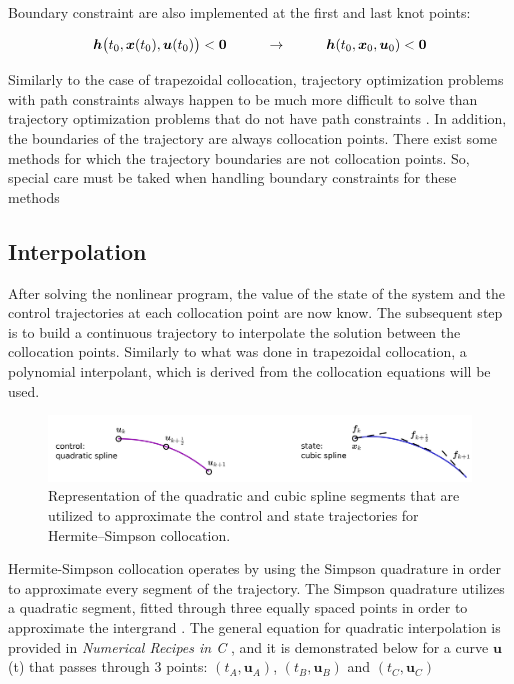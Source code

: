 \documentclass{thesisreport}
\begin{document}
\noindent Boundary constraint are also implemented at the first and last knot points:

\begin{equation}
\bm{h}\big(t_0,\bm{x}(t_0),\bm{u}(t_0)\big) < \bm{0} \text{\hspace{1cm}} \rightarrow \text{\hspace{1cm}} \bm{h}(t_0,\bm{x}_0,\bm{u}_0) <\bm{0}
\end{equation}

\noindent Similarly to the case of trapezoidal collocation, trajectory optimization problems with path constraints always happen to be much more difficult to solve than trajectory optimization problems that do not have path constraints \cite{Betts2010}. In addition, the boundaries of the trajectory are always collocation points. There exist some methods for which the trajectory boundaries are not collocation points. So, special care must be taked when handling boundary constraints for these methods \cite{Benson2006, Garg2010}
  
\subsection{Interpolation}
 
 After solving the nonlinear program, the value of the state of the system and the control trajectories at each collocation point are now know. The subsequent step is to build a continuous trajectory to interpolate the solution between the collocation points. Similarly to what was done in trapezoidal collocation, a polynomial interpolant, which is derived from the collocation equations will be used.
  
 \begin{figure}[h]
 \centering 
 \includegraphics[width=\textwidth]{Images/Trajectory/Hermite-Simpson_Rule}
 \caption{Representation of the quadratic and cubic spline segments that are utilized to approximate the control and state trajectories for Hermite–Simpson collocation.}
 \label{Hermite-Simpson_figure_}
 \end{figure}

Hermite-Simpson collocation operates by using the Simpson quadrature in order to approximate every segment of the trajectory. 
The Simpson quadrature utilizes a quadratic segment, fitted through three equally spaced points in order to approximate the intergrand \cite{Kelly2017}. The general equation for quadratic interpolation is provided in \textit{Numerical Recipes in C} \cite{Press1992}, and it is demonstrated below for a curve $\bm{u}$(t) that passes through 3 points: $(t_A,\bm{u}_A)$, $(t_B,\bm{u}_B)$ and $(t_C,\bm{u}_C)$
\end{document}
